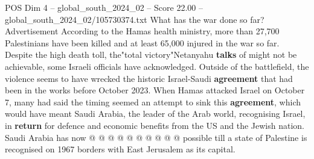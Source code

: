 \begin{textsample}{POS Dim 4 – global\_south\_2024\_02 – Score 22.00 – global\_south\_2024\_02/105730374.txt}
What has the war done so far?
Advertisement According to the Hamas health ministry, more than 27,700 Palestinians have been killed and at least 65,000 injured in the war so far.
Despite the high death toll, the"total victory"Netanyahu \textbf{talks} of might not be achievable, some Israeli officials have acknowledged.
Outside of the battlefield, the violence seems to have wrecked the historic Israel-Saudi \textbf{agreement} that had been in the works before October 2023.
When Hamas attacked Israel on October 7, many had said the timing seemed an attempt to sink this \textbf{agreement}, which would have meant Saudi Arabia, the leader of the Arab world, recognising Israel, in \textbf{return} for defence and economic benefits from the US and the Jewish nation.
Saudi Arabia has now @ @ @ @ @ @ @ @ @ @ possible till a state of Palestine is recognised on 1967 borders with East Jerusalem as its capital.

\end{textsample}
